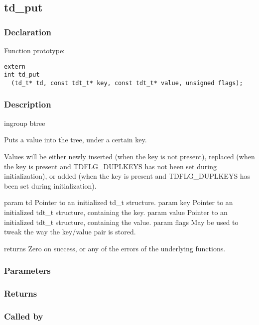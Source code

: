 
\newpage
\subsection{td\_put}
\subsubsection{Declaration} Function prototype:

\begin{verbatim}
extern
int td_put
  (td_t* td, const tdt_t* key, const tdt_t* value, unsigned flags);
\end{verbatim}

\subsubsection{Description}


 ingroup btree

 Puts a value into the tree, under a certain key.

 Values will be either newly inserted (when the key is not present),
 replaced (when the key is present and TDFLG\_DUPLKEYS has not been set during
 initialization), or added (when the key is present and TDFLG\_DUPLKEYS
 has been set during initialization).

 param td Pointer to an initialized td\_t structure.
 param key Pointer to an initialized tdt\_t structure, containing the key.
 param value Pointer to an initialized tdt\_t structure, containing the value.
 param flags May be used to tweak the way the key/value pair is stored.

 returns Zero on success, or any of the errors of the underlying
 functions.
 

\subsubsection{Parameters}
\subsubsection{Returns}
\subsubsection{Called by}
